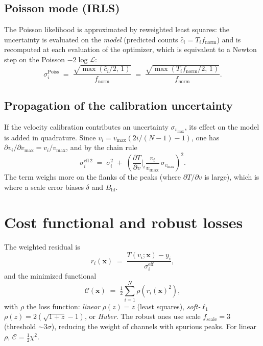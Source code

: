 \documentclass[11pt,a4paper]{article}
\newcommand{\BHF}{B_{\mathrm{hf}}}
\begin{document}
\subsection{Poisson mode (IRLS)}
The Poisson likelihood is approximated by reweighted least squares: the
uncertainty is evaluated on the \emph{model} (predicted counts
$\hat c_i = T_i f_{\text{norm}}$) and is recomputed at each evaluation of the
optimizer, which is equivalent to a Newton step on the Poisson $-2\log\mathcal L$:
\begin{equation}
  \sigma_i^{\text{Poiss}} \;=\; \frac{\sqrt{\max(\hat c_i/2,\,1)}}{f_{\text{norm}}}
  \;=\; \frac{\sqrt{\max(T_i f_{\text{norm}}/2,\,1)}}{f_{\text{norm}}}.
  \label{eq:sigma-poisson}
\end{equation}

\subsection{Propagation of the calibration uncertainty}\label{sec:calib}
If the velocity calibration contributes an uncertainty $\sigma_{v_{\max}}$, its
effect on the model is added in quadrature. Since $v_i=v_{\max}(2i/(N-1)-1)$, one
has $\partial v_i/\partial v_{\max}=v_i/v_{\max}$, and by the chain rule
\begin{equation}
  \sigma_i^{\text{eff}\,2} \;=\; \sigma_i^2 \;+\;
  \left(\frac{\partial T}{\partial v}\bigg|_i \frac{v_i}{v_{\max}}\,\sigma_{v_{\max}}\right)^{\!2}.
  \label{eq:calib}
\end{equation}
The term weighs more on the flanks of the peaks (where $\partial T/\partial v$ is
large), which is where a scale error biases $\delta$ and $\BHF$.

\section{Cost functional and robust losses}\label{sec:cost}

The weighted residual is
\begin{equation}
  r_i(\bm x) \;=\; \frac{T(v_i;\bm x)-y_i}{\sigma_i^{\text{eff}}},
  \label{eq:residuo}
\end{equation}
and the minimized functional
\begin{equation}
  \mathcal C(\bm x) \;=\; \tfrac12 \sum_{i=1}^{N}\rho\!\left(r_i(\bm x)^2\right),
  \label{eq:cost}
\end{equation}
with $\rho$ the loss function: \emph{linear} $\rho(z)=z$ (least squares),
\emph{soft-}$\ell_1$ $\rho(z)=2(\sqrt{1+z}-1)$, or \emph{Huber}. The robust ones use
scale $f_{\text{scale}}=3$ (threshold $\sim3\sigma$), reducing the weight of channels
with spurious peaks. For linear $\rho$, $\mathcal C=\tfrac12\chi^2$.
\end{document}
